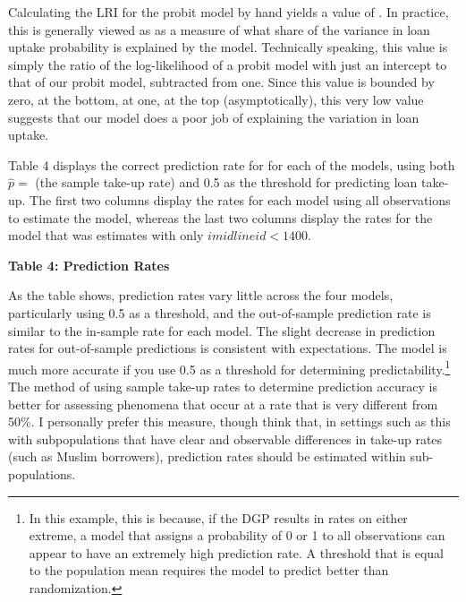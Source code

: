 \documentclass{article}
\begin{document}
Calculating the LRI for the probit model by hand yields a value of . In practice, this is generally viewed as as a measure of what share of the variance in loan uptake probability is explained by the model. Technically speaking, this value is simply the ratio of the log-likelihood of a probit model with just an intercept to that of our probit model, subtracted from one. Since this value is bounded by zero, at the bottom, at one, at the top (asymptotically), this very low value suggests that our model does a poor job of explaining the variation in loan uptake.

Table 4 displays the correct prediction rate for for each of the models, using both $\hat{p}=$ (the sample take-up rate) and 0.5 as the threshold for predicting loan take-up. The first two columns display the rates for each model using all observations to estimate the model, whereas the last two columns display the rates for the model that was estimates with only $imidlineid<1400$.
\begin{center}
        \textbf{Table 4: Prediction Rates} \\\medskip
        
\end{center}
As the table shows, prediction rates vary little across the four models, particularly using 0.5 as a threshold, and the out-of-sample prediction rate is similar to the in-sample rate for each model. The slight decrease in prediction rates for out-of-sample predictions is consistent with expectations. The model is much more accurate if you use 0.5 as a threshold for determining predictability.\footnote{In this example, this is because, if the DGP results in rates on either extreme, a model that assigns a probability of 0 or 1 to all observations can appear to have an extremely high prediction rate. A threshold that is equal to the population mean requires the model to predict better than randomization.} The method of using sample take-up rates to determine prediction accuracy is better for assessing phenomena that occur at a rate that is very different from 50\%. I personally prefer this measure, though think that, in settings such as this with subpopulations that have clear and observable differences in take-up rates (such as Muslim borrowers), prediction rates should be estimated within sub-populations.
\end{document}
